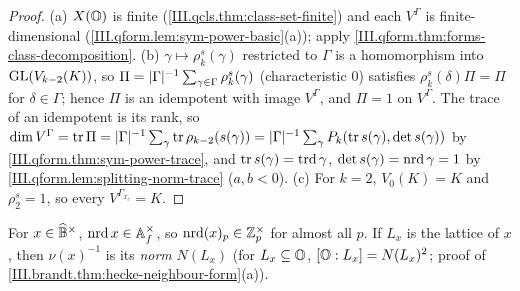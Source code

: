 \begin{corollary}[dimensions]
\end{corollary}
\begin{proof}
(a) $X(\mathbb{O})$ is finite (\cref{III.qcls.thm:class-set-finite}) and each $V^{\Gamma}$ is finite-dimensional
(\cref{III.qform.lem:sym-power-basic}(a)); apply \cref{III.qform.thm:forms-class-decomposition}. (b) $\gamma\mapsto\rho_k^s(\gamma)$ restricted to $\Gamma$ is a
homomorphism into $\mathrm{GL}(V_{k-2}(K))$, so $\Pi=\lvert\Gamma\rvert^{-1}\sum_{\gamma\in\Gamma}\rho_k^s(\gamma)$ (characteristic $0$) satisfies $\rho_k^s(\delta)\Pi=\Pi$
for $\delta\in\Gamma$; hence $\Pi$ is an idempotent with image $V^\Gamma$, and $\Pi=1$ on $V^\Gamma$. The trace of an idempotent is its rank, so
$\dim V^\Gamma=\operatorname{tr}\Pi=\lvert\Gamma\rvert^{-1}\sum_\gamma\operatorname{tr}\rho_{k-2}(s(\gamma))=\lvert\Gamma\rvert^{-1}\sum_\gamma P_k(\operatorname{tr} s(\gamma),\det s(\gamma))$ by
\cref{III.qform.thm:sym-power-trace}, and $\operatorname{tr} s(\gamma)=\operatorname{trd}\gamma$, $\det s(\gamma)=\operatorname{nrd}\gamma=1$ by \cref{III.qform.lem:splitting-norm-trace}
($a,b<0$). (c) For $k=2$, $V_0(K)=K$ and $\rho_2^s=1$, so every $V^{\Gamma_{x_c}}=K$.
\end{proof}

\begin{definition}
\end{definition}

\begin{definition}
\end{definition}
\noindent For $x\in\widehat{\mathbb{B}}^\times$, $\operatorname{nrd} x\in\mathbb{A}_f^\times$, so $\operatorname{nrd}(x)_p\in\mathbb{Z}_p^\times$ for almost all $p$. If $L_x$ is the lattice of $x$, then
$\nu(x)^{-1}$ is its \emph{norm} $N(L_x)$ (for $L_x\subseteq\mathbb{O}$, $[\mathbb{O}:L_x]=N(L_x)^2$; proof of \cref{III.brandt.thm:hecke-neighbour-form}(a)).

